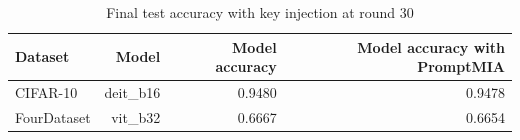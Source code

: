 \begin{table}[htbp]
\centering
\begin{tabular}{lrrr}
\toprule
Dataset & Model & Model accuracy & Model accuracy with PromptMIA \\
\midrule
CIFAR-10 & deit\_b16 & 0.9480 & 0.9478 \\
FourDataset & vit\_b32 & 0.6667 & 0.6654 \\
\bottomrule
\end{tabular}
\caption{Final test accuracy with key injection at round 30}
\label{tab:table8}
\end{table}
